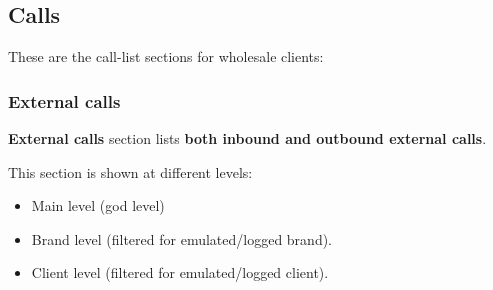 \documentclass[letterpaper,10pt,english]{sphinxmanual}
\begin{document}
\subsection{Calls}
\label{administration_portal/client/wholesale/calls/index::doc}\label{administration_portal/client/wholesale/calls/index:calls}
These are the call-list sections for wholesale clients:


\subsubsection{External calls}
\label{administration_portal/client/wholesale/calls/external_calls:id1}\label{administration_portal/client/wholesale/calls/external_calls::doc}\label{administration_portal/client/wholesale/calls/external_calls:external-calls}
\textbf{External calls} section lists \textbf{both inbound and outbound external calls}.

This section is shown at different levels:
\begin{itemize}
\item {} 
Main level (god level)

\item {} 
Brand level (filtered for emulated/logged brand).

\item {} 
Client level (filtered for emulated/logged client).

\end{itemize}
\end{document}
